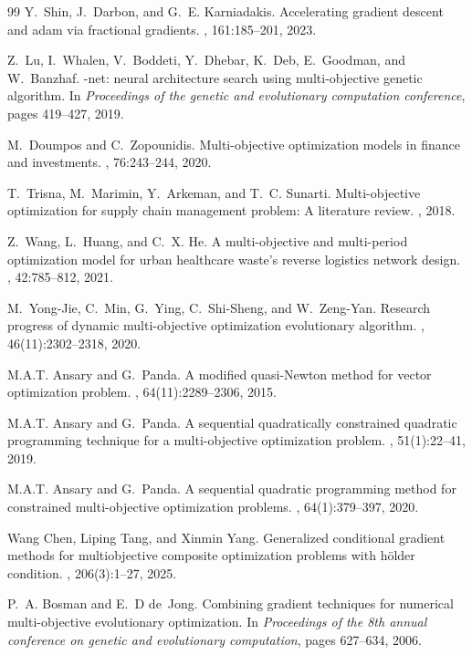 \documentclass[smallextended,referee,envcountsect]{svjour3}
\begin{document}
\begin{thebibliography}{99}
Y.~Shin, J.~Darbon, and G.~E. Karniadakis.
\newblock Accelerating gradient descent and adam via fractional gradients.
, 161:185--201, 2023.

Z.~Lu, I.~Whalen, V.~Boddeti, Y.~Dhebar, K.~Deb, E.~Goodman, and W.~Banzhaf.
-net: neural architecture search using multi-objective genetic algorithm.
\newblock In {\em Proceedings of the genetic and evolutionary computation conference}, pages 419--427, 2019.

M.~Doumpos and C.~Zopounidis.
\newblock Multi-objective optimization models in finance and investments.
, 76:243--244, 2020.

T.~Trisna, M.~Marimin, Y.~Arkeman, and T.~C. Sunarti.
\newblock Multi-objective optimization for supply chain management problem: A literature review.
, 2018.

Z.~Wang, L.~Huang, and C.~X. He.
\newblock A multi-objective and multi-period optimization model for urban healthcare waste’s reverse logistics network design.
, 42:785--812, 2021.

M.~Yong-Jie, C.~Min, G.~Ying, C.~Shi-Sheng, and W.~Zeng-Yan.
\newblock Research progress of dynamic multi-objective optimization evolutionary algorithm.
, 46(11):2302--2318, 2020.

M.A.T. Ansary and G.~Panda.
\newblock A modified quasi-{Newton} method for vector optimization problem.
, 64(11):2289--2306, 2015.

M.A.T. Ansary and G.~Panda.
\newblock A sequential quadratically constrained quadratic programming technique for a multi-objective optimization problem.
, 51(1):22--41, 2019.

M.A.T. Ansary and G.~Panda.
\newblock A sequential quadratic programming method for constrained multi-objective optimization problems.
, 64(1):379--397, 2020.

Wang Chen, Liping Tang, and Xinmin Yang.
\newblock Generalized conditional gradient methods for multiobjective composite optimization problems with h{\"o}lder condition.
, 206(3):1--27, 2025.

P.~A. Bosman and E.~D de~Jong.
\newblock Combining gradient techniques for numerical multi-objective evolutionary optimization.
\newblock In {\em Proceedings of the 8th annual conference on genetic and evolutionary computation}, pages 627--634, 2006.


\end{thebibliography}
\end{document}
